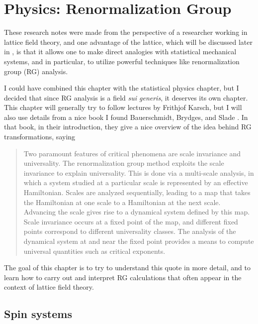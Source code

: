 \chapter{Physics: Renormalization Group}

These research notes were made from the perspective of a researcher working
in lattice field theory, and one advantage of the lattice, which will be
discussed later in , is that it allows one
to make direct analogies with statistical mechanical systems, and in
particular, to utilize powerful techniques like renormalization group (RG)
analysis.

I could have combined this chapter with the statistical physics chapter, but I
decided that since RG analysis is a field {\it sui generis},
it deserves its own chapter.  This chapter will generally try to follow 
lectures by Frithjof Karsch, but I will also use details from a nice
book I found Bauerschmidt, Brydges, and Slade \cite{Bauerschmidt_2019}.
In that book, in their introduction, they give a nice overview of the idea
behind RG transformations, saying
\begin{quote}
Two paramount features of critical phenomena are scale invariance and 
universality. The renormalization group method exploits the scale 
invariance to explain universality. This is done via a multi-scale analysis, 
in which a system studied at a particular scale is represented by an 
effective Hamiltonian. Scales are analyzed sequentially, leading to a map 
that takes the Hamiltonian at one scale to a Hamiltonian at the next scale. 
Advancing the scale gives rise to a dynamical system defined by this map. 
Scale invariance occurs at a fixed point of the map, and different fixed
points correspond to different universality classes. The analysis of the 
dynamical system at and near the fixed point provides a means to compute 
universal quantities such as critical exponents. 
\end{quote} 
The goal of this chapter is to try to understand this quote in more detail,
and to learn how to carry out and interpret RG calculations that often
appear in the context of lattice field theory.

\section{Spin systems}





